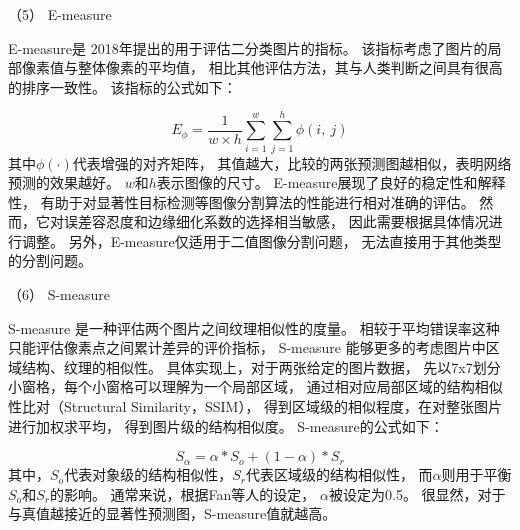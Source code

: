（5）
E-measure






E-measure是
2018年提出的用于评估二分类图片的指标。
该指标考虑了图片的局部像素值与整体像素的平均值，
相比其他评估方法，其与人类判断之间具有很高的排序一致性。
该指标的公式如下：







\begin{equation}
	E_{\phi } = \frac{1}{w \times h} \sum_{i=1}^{w} \sum_{j=1}^{h} \phi\left ( i,~j \right ) 
\end{equation}
%
%
%
%
其中$\phi\left (\cdot \right ) $代表增强的对齐矩阵，
其值越大，比较的两张预测图越相似，表明网络预测的效果越好。
$w$和$h$表示图像的尺寸。
E-measure展现了良好的稳定性和解释性，
有助于对显著性目标检测等图像分割算法的性能进行相对准确的评估。
然而，它对误差容忍度和边缘细化系数的选择相当敏感，
因此需要根据具体情况进行调整。
另外，E-measure仅适用于二值图像分割问题，
无法直接用于其他类型的分割问题。




（6）
S-measure


S-measure 是一种评估两个图片之间纹理相似性的度量。
相较于平均错误率这种只能评估像素点之间累计差异的评价指标，
S-measure 能够更多的考虑图片中区域结构、纹理的相似性。
具体实现上，对于两张给定的图片数据，
先以7x7划分小窗格，每个小窗格可以理解为一个局部区域，
通过相对应局部区域的结构相似性比对（Structural Similarity，SSIM），
得到区域级的相似程度，在对整张图片进行加权求平均，
得到图片级的结构相似度。
S-measure的公式如下：



\begin{equation}
	S_{\alpha} = \alpha * S_{o} + \left ( 1 - \alpha  \right )*S_{r} 
\end{equation}
%
%
其中，$S_{o}$代表对象级的结构相似性，$S_{r}$代表区域级的结构相似性，
而$\alpha$则用于平衡$S_{o}$和$S_{r}$的影响。
通常来说，根据Fan等人的设定，
$\alpha$被设定为0.5。
很显然，对于与真值越接近的显著性预测图，S-measure值就越高。



